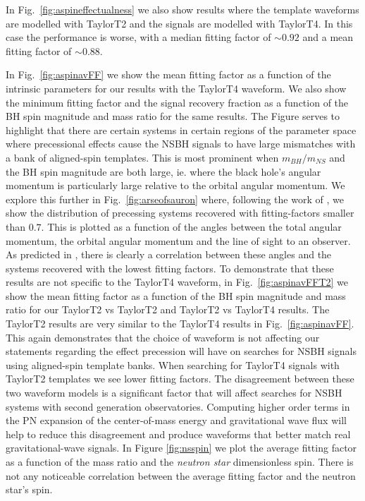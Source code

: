 In Fig.~\ref{fig:aspineffectualness} we also show results where the template
waveforms are modelled with TaylorT2 and the signals are modelled with TaylorT4.
In this case the performance is worse, with a median fitting factor of $\sim
0.92$ and a mean fitting factor of $\sim 0.88$.

In Fig.~\ref{fig:aspinavFF} we show the mean fitting factor as a function of
the intrinsic parameters
for our results with the TaylorT4 waveform. We also show the minimum fitting
factor and the signal recovery
fraction as a function of the \ac{BH} spin magnitude
and mass ratio for the same results.
The Figure serves to highlight that there are certain
systems in certain regions of the parameter space where precessional effects
cause the \ac{NSBH} signals to have large mismatches with a bank of
aligned-spin templates. This is most prominent when $m_{BH} / m_{NS}$ and the
\ac{BH} spin magnitude are both large, ie. where the black 
hole's angular momentum is particularly large relative to the orbital angular 
momentum. 
We explore this further in Fig.~\ref{fig:arseofsauron} where, following the
work of \cite{Brown:2012gs}, we show the distribution
of precessing systems recovered with fitting-factors smaller than $0.7$. This
is plotted as a function of the angles between the total angular 
momentum, the orbital angular momentum and the line of sight to an observer. 
As predicted in \cite{Brown:2012gs}, there is clearly a correlation
between these angles and the systems recovered with the lowest fitting factors.
To demonstrate that these results are not specific to the TaylorT4 waveform, in
Fig.~\ref{fig:aspinavFFT2} we show the mean fitting factor as a function of
the \ac{BH} spin magnitude and mass ratio for our TaylorT2 vs TaylorT2 and
TaylorT2 vs TaylorT4 results. The TaylorT2 results are very similar to the
TaylorT4 results in Fig.~\ref{fig:aspinavFF}. This again demonstrates that the
choice of waveform is not affecting our statements regarding the effect
precession will have on searches for \ac{NSBH} signals using aligned-spin
template banks. When searching for TaylorT4 signals with TaylorT2 templates
we see lower fitting factors. The disagreement between these two waveform models
is a significant factor that will affect searches for \ac{NSBH} systems with
second generation observatories. Computing higher order terms in the \acf{PN}
expansion of the center-of-mass energy and gravitational wave flux will help to
reduce this disagreement and produce waveforms that better match real
gravitational-wave signals. In Figure \ref{fig:nsspin} we plot the average 
fitting factor as a function of the mass ratio and the \emph{neutron star} 
dimensionless spin. There is not any noticeable correlation between the average 
fitting factor and the neutron star's spin.

